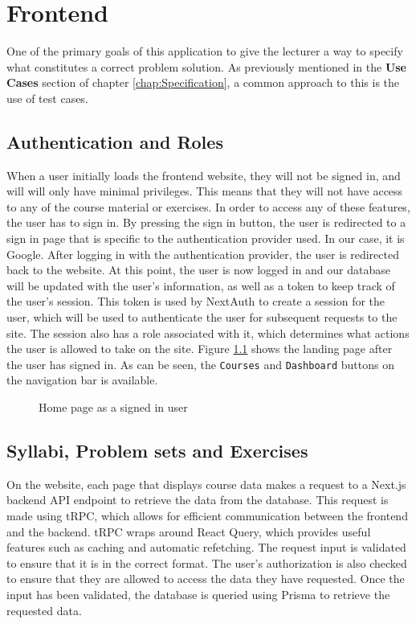 \chapter{Frontend} \label{chap:Frontend} 
One of the primary goals of this application to give the lecturer a way to specify what constitutes a correct problem solution.
As previously mentioned in the \textbf{Use Cases} section of chapter \ref{chap:Specification}, a common approach to this is the use of test cases.

\section{Authentication and Roles}
When a user initially loads the frontend website, they will not be signed in, and will will only have minimal privileges.
This means that they will not have access to any of the course material or exercises.
In order to access any of these features, the user has to sign in.
By pressing the sign in button, the user is redirected to a sign in page that is specific to the authentication provider used.
In our case, it is Google.
After logging in with the authentication provider, the user is redirected back to the website.
At this point, the user is now logged in and our database will be updated with the user's information, as well as a token to keep track of the user's session.
This token is used by NextAuth to create a session for the user, which will be used to authenticate the user for subsequent requests to the site.
The session also has a role associated with it, which determines what actions the user is allowed to take on the site.
Figure \ref{fig:Home page} shows the landing page after the user has signed in. As can be seen, the \texttt{Courses} and \texttt{Dashboard} buttons on the navigation bar is available.
\begin{figure}[H]
    \centering
    \caption{Home page as a signed in user}
    \label{fig:Home page}
\end{figure}

\section{Syllabi, Problem sets and Exercises}
On the website, each page that displays course data makes a request to a Next.js backend API endpoint to retrieve the data from the database.
This request is made using tRPC, which allows for efficient communication between the frontend and the backend. tRPC wraps around React Query, which provides useful features such as caching and automatic refetching.
The request input is validated to ensure that it is in the correct format.
The user's authorization is also checked to ensure that they are allowed to access the data they have requested.
Once the input has been validated, the database is queried using Prisma to retrieve the requested data.

